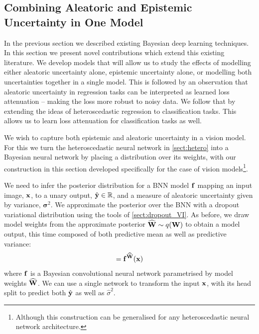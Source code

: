 \subsection{Combining Aleatoric and Epistemic Uncertainty in One Model}
\label{sec:method}

In the previous section we described existing Bayesian deep learning techniques. In this section we present novel contributions which extend this existing literature. We develop models that will allow us to study the effects of modelling either aleatoric uncertainty alone, epistemic uncertainty alone, or modelling both uncertainties together in a single model. This is followed by an observation that aleatoric uncertainty in regression tasks can be interpreted as learned loss attenuation -- making the loss more robust to noisy data. We follow that by extending the ideas of heteroscedastic regression to classification tasks. This allows us to learn loss attenuation for classification tasks as well. %


We wish to capture both epistemic and aleatoric uncertainty in a vision model.
For this we turn the heteroscedastic neural network in \cref{sect:hetero} into a Bayesian neural network by placing a distribution over its weights, with our construction in this section developed specifically for the case of vision models\footnote{Although this construction can be generalised for any heteroscedastic neural network architecture.}.

We need to infer the posterior distribution for a BNN model $\mathbf{f}$ mapping an input image, $\mathbf{x}$, to a unary output, $\hat{\mathbf{y}} \in \mathbb{R}$, and a measure of aleatoric uncertainty given by variance, $\mathbf{\sigma}^2$. We approximate the posterior over the BNN with a dropout variational distribution using the tools of \cref{sect:dropout_VI}. 
As before, we draw model weights from the approximate posterior ${\widehat{\mathbf{W}}} \sim q(\mathbf{W})$ to obtain a model output, this time composed of both predictive mean as well as predictive variance:
\begin{equation}
[\hat{\y}, \hat{\mathbf{\sigma}}^2] = \f^{\Wh}(\textbf{x})
\end{equation}
where $\mathbf{f}$ is a Bayesian convolutional neural network parametrised by model weights ${\widehat{\mathbf{W}}}$. We can use a single network to transform the input $\mathbf{x}$, with its head split to predict both $\hat{\mathbf{y}}$ as well as $\hat{\sigma}^2$.

